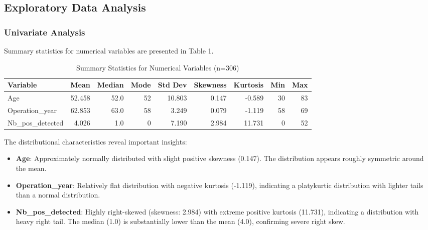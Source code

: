 \documentclass[12pt,a4paper]{article}
\begin{document}
\subsection{Exploratory Data Analysis}

\subsubsection{Univariate Analysis}

Summary statistics for numerical variables are presented in Table 1.

\begin{table}[H]
\centering
\caption{Summary Statistics for Numerical Variables (n=306)}
\label{tab:summary_stats}
\small
\begin{tabular}{lrrrrrrrr}
\toprule
\textbf{Variable} & \textbf{Mean} & \textbf{Median} & \textbf{Mode} & \textbf{Std Dev} & \textbf{Skewness} & \textbf{Kurtosis} & \textbf{Min} & \textbf{Max} \\
\midrule
Age & 52.458 & 52.0 & 52 & 10.803 & 0.147 & -0.589 & 30 & 83 \\
Operation\_year & 62.853 & 63.0 & 58 & 3.249 & 0.079 & -1.119 & 58 & 69 \\
Nb\_pos\_detected & 4.026 & 1.0 & 0 & 7.190 & 2.984 & 11.731 & 0 & 52 \\
\bottomrule
\end{tabular}
\end{table}

The distributional characteristics reveal important insights:

\begin{itemize}
    \item \textbf{Age}: Approximately normally distributed with slight positive skewness (0.147). The distribution appears roughly symmetric around the mean.
    
    \item \textbf{Operation\_year}: Relatively flat distribution with negative kurtosis (-1.119), indicating a platykurtic distribution with lighter tails than a normal distribution.
    
    \item \textbf{Nb\_pos\_detected}: Highly right-skewed (skewness: 2.984) with extreme positive kurtosis (11.731), indicating a distribution with heavy right tail. The median (1.0) is substantially lower than the mean (4.0), confirming severe right skew.
\end{itemize}
\end{document}
